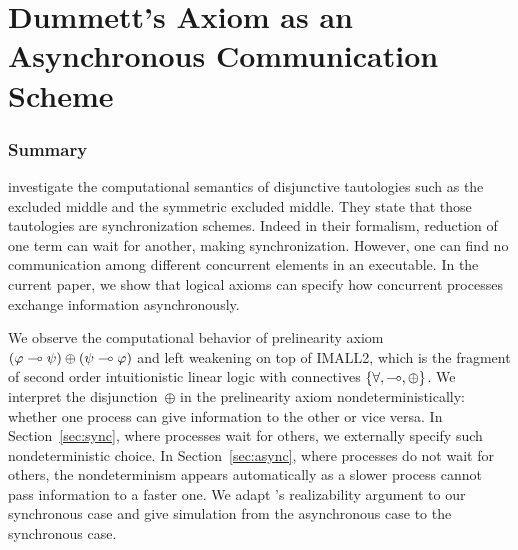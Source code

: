 \chapter{Dummett's Axiom as an Asynchronous Communication Scheme}




% 



\subsection{Summary}
\citet{danos-krivine} investigate
the computational semantics of disjunctive tautologies
such as the excluded middle and the symmetric excluded middle.
They state that those tautologies are synchronization schemes.
Indeed in their formalism, reduction of one term can wait
for another, making synchronization.
However,
one can find no communication among different
concurrent elements in an executable.
In the current paper, we show that logical axioms can specify how
concurrent processes exchange information asynchronously.

We observe the computational behavior of prelinearity axiom
$(\varphi\multimap\psi)\oplus(\psi\multimap\varphi)$ and left weakening
on top of IMALL2, which is the fragment of second order
intuitionistic linear logic with connectives $\{\forall, \multimap,
\oplus\}$.
We interpret the disjunction~$\oplus$ in the prelinearity axiom
nondeterministically: whether
one process can give information to the other or
vice versa.
In Section~\ref{sec:sync}, where processes wait for others,
we externally specify such nondeterministic choice.
In Section~\ref{sec:async}, where processes do not wait for others,
the nondeterminism appears automatically as a slower process cannot pass
information to a faster one.
We adapt \citet{danos-krivine}'s realizability argument to our
synchronous case and give simulation from the
asynchronous case to the synchronous case.

